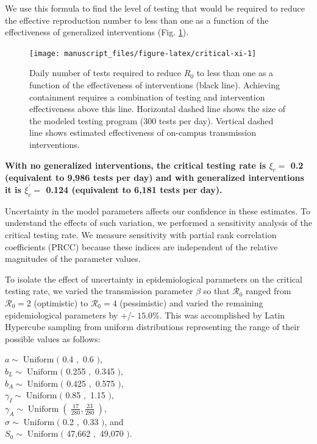 \documentclass[
]{article}
\begin{document}
We use this formula to find the level of testing that would be required
to reduce the effective reproduction number to less than one as a
function of the effectiveness of generalized interventions (Fig.
\ref{fig:critical-xi}).

\begin{figure}

{\centering \texttt{[image: manuscript\_files/figure-latex/critical-xi-1]} 

}

\caption{\label{fig:critical-xi}Daily number of tests required to reduce $R_0$ to less than one as a function of the effectiveness of interventions (black line). Achieving containment requires a combination of testing and intervention effectiveness above this line. Horizontal dashed line shows the size of the modeled testing program (300 tests per day). Vertical dashed line shows estimated effectiveness of on-campus transmission interventions.}\label{fig:critical-xi}
\end{figure}

\textbf{With no generalized interventions, the critical testing rate is
\(\xi_c =\) 0.2 (equivalent to 9,986 tests per day) and with generalized
interventions it is \(\xi_c^\prime =\) 0.124 (equivalent to 6,181 tests
per day).}

Uncertainty in the model parameters affects our confidence in these
estimates. To understand the effects of such variation, we performed a
sensitivity analysis of the critical testing rate. We measure
sensitivity with partial rank correlation coefficients (PRCC) because
these indices are independent of the relative magnitudes of the
parameter values.

To isolate the effect of uncertainty in epidemiological parameters on
the critical testing rate, we varied the transmission parameter
\(\beta\) so that \(\mathcal{R}_0\) ranged from \(\mathcal{R}_0=2\)
(optimistic) to \(\mathcal{R}_0=4\) (pessimistic) and varied the
remaining epidemiological parameters by +/- \(15.0%
\)\%. This was accomplished by Latin Hypercube sampling from uniform
distributions representing the range of their possible values as
follows:

\(a\sim \operatorname{Uniform}(\) 0.4 \(,\) 0.6 \()\),\\
\(b_L\sim \operatorname{Uniform}(\) 0.255 \(,\) 0.345 \()\),\\
\(b_A\sim \operatorname{Uniform}(\) 0.425 \(,\) 0.575 \()\),\\
\(\gamma_I\sim \operatorname{Uniform}(\) 0.85 \(,\) 1.15 \()\),\\
\(\gamma_A\sim \operatorname{Uniform}(~\frac{17}{280},\frac{23}{280}~)\),\\
\(\sigma\sim \operatorname{Uniform}(\) 0.2 \(,\) 0.33 \()\), and\\
\(S_0\sim \operatorname{Uniform}(\) 47,662 \(,\) 49,070 \()\).
\end{document}
